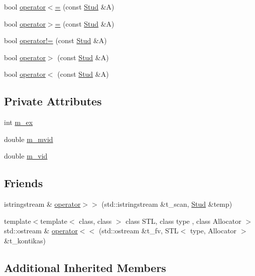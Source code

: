 \begin{DoxyCompactItemize}
bool \mbox{\hyperlink{class_stud_adc0b5c12c3c26fdc2c0baaba9df2619c}{operator$<$=}} (const \mbox{\hyperlink{class_stud}{Stud}} \&A)
\item 
bool \mbox{\hyperlink{class_stud_a1d5e445949cab995194094100f7ead13}{operator$>$=}} (const \mbox{\hyperlink{class_stud}{Stud}} \&A)
\item 
bool \mbox{\hyperlink{class_stud_a6b08af30aac6482b43624c17da099e2f}{operator!=}} (const \mbox{\hyperlink{class_stud}{Stud}} \&A)
\item 
bool \mbox{\hyperlink{class_stud_a36be89d64a926e7ef2e5c07f97364998}{operator$>$}} (const \mbox{\hyperlink{class_stud}{Stud}} \&A)
\item 
bool \mbox{\hyperlink{class_stud_aeb5b71435c3d09d857894b3d6048c013}{operator$<$}} (const \mbox{\hyperlink{class_stud}{Stud}} \&A)
\end{DoxyCompactItemize}
\subsection*{Private Attributes}
\begin{DoxyCompactItemize}
\item 
int \mbox{\hyperlink{class_stud_a5f52cca0a5786042eac89aba670c0bb7}{m\+\_\+ex}}
\item 
double \mbox{\hyperlink{class_stud_a33421b12df3d9995f0e59f7ac21b262e}{m\+\_\+mvid}}
\item 
double \mbox{\hyperlink{class_stud_af5365d950f39faf16533a67eeebb4c7a}{m\+\_\+vid}}
\end{DoxyCompactItemize}
\subsection*{Friends}
\begin{DoxyCompactItemize}
\item 
istringstream \& \mbox{\hyperlink{class_stud_a71505fcbc6a3d59bd212b89b478962ce}{operator$>$$>$}} (std\+::istringstream \&t\+\_\+scan, \mbox{\hyperlink{class_stud}{Stud}} \&temp)
\item 
{\footnotesize template$<$template$<$ class, class $>$ class S\+TL, class type , class Allocator $>$ }\\std\+::ostream \& \mbox{\hyperlink{class_stud_ac58e1fdedfbed178b8d5c57069020996}{operator$<$$<$}} (std\+::ostream \&t\+\_\+fv, S\+TL$<$ type, Allocator $>$ \&t\+\_\+kontikas)
\end{DoxyCompactItemize}
\subsection*{Additional Inherited Members}


